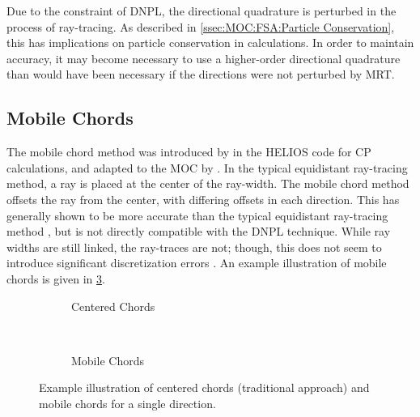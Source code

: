 {{{        Due to the constraint of \ac{DNPL}, the directional quadrature is perturbed in the process of ray-tracing.
        As described in \cref{ssec:MOC:FSA:Particle Conservation}, this has implications on particle conservation in calculations.
        In order to maintain accuracy, it may become necessary to use a higher-order directional quadrature than would have been necessary if the directions were not perturbed by \ac{MRT}.
      }

      \subsection{Mobile Chords}{\label{ssec:RT:Mobile Chords}
        The mobile chord method was introduced by \citet{Villarino1992} in the HELIOS code for \ac{CP} calculations, and adapted to the \ac{MOC} by \citet{Yamamoto2008}.
        In the typical equidistant ray-tracing method, a ray is placed at the center of the ray-width.
        The mobile chord method offsets the ray from the center, with differing offsets in each direction.
        This has generally shown to be more accurate than the typical equidistant ray-tracing method \cite{Yamamoto2008}, but is not directly compatible with the \ac{DNPL} technique.
        While ray widths are still linked, the ray-traces are not; though, this does not seem to introduce significant discretization errors \cite{Yamamoto2008}.
        An example illustration of mobile chords is given in \cref{figs:RT:MobileChords}.

        \begin{figure}[h]
          \centering
          \begin{subfigure}[t]{0.45\textwidth}
            \centering
            \def\svgwidth{0.85\textwidth}
            
            \caption{Centered Chords\label{fig:RT:MobileChords:Normal}}
          \end{subfigure}%
          ~
          \begin{subfigure}[t]{0.45\textwidth}
            \centering
            \def\svgwidth{0.85\textwidth}
            
            \caption{Mobile Chords\label{fig:RT:MobileChords:MobileChords}}
          \end{subfigure}
          \caption{Example illustration of centered chords (traditional approach) and mobile chords for a single direction.\label{figs:RT:MobileChords}}
        \end{figure}
      }

}}
